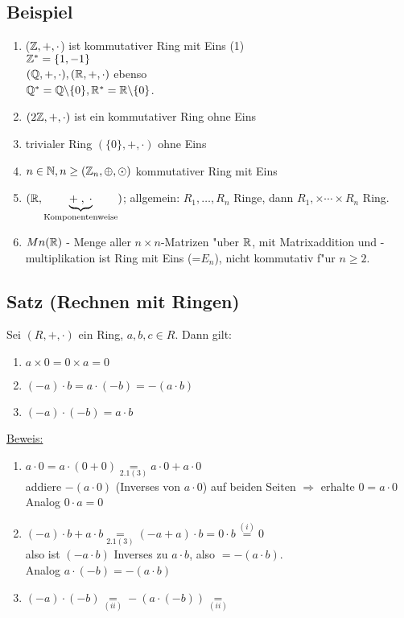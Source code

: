 \subsection{Beispiel}
\begin{enumerate}
	\item
	($\mathbb{Z}, +, \cdot$) ist kommutativer Ring mit Eins (1)\\
	$\mathbb{Z}^* = \{1,-1\}$\\
	$(\mathbb{Q}, +, \cdot), (\mathbb{R}, +, \cdot)$ ebenso\\
	$\mathbb{Q}^*=\mathbb{Q} \backslash \{0\}, \mathbb{R}^* = \mathbb{R} \backslash \{0\}$.
	\item
	$(2\mathbb{Z}, +, \cdot)$ ist ein kommutativer Ring ohne Eins
	\item
	trivialer Ring $(\{0\},+, \cdot)$ ohne Eins
	\item
	$n \in \mathbb{N}, n \geq (\mathbb{Z}_n, \oplus, \odot)$ kommutativer Ring mit Eins
	\item
	$(\mathbb{R}, \underbrace{+\; ,\; \cdot}_{\text{Komponentenweise}})$; allgemein: $R_1, \dots , R_n$ Ringe, dann $R_1, \times \cdots \times R_n$ Ring.
	\item
	$Mn (\mathbb{R})$ - Menge aller $n \times n$-Matrizen  "uber $\mathbb{R}$, mit Matrixaddition und -multiplikation ist Ring mit Eins (=$E_n$), nicht kommutativ f"ur $ n \geq 2$.
\end{enumerate}
\subsection[Satz: Rechnen mit Ringen]{Satz (Rechnen mit Ringen)}
Sei $(R, +, \cdot)$ ein Ring, $a,b,c \in R$. Dann gilt:
\begin{enumerate}
	\item
	$a \times 0 = 0 \times a = 0$
	\item 
	$(-a)\cdot b = a \cdot (-b) = -(a \cdot b)$
	\item
	$(-a) \cdot (-b) = a \cdot b$
\end{enumerate}
\underline{Beweis:}
\begin{enumerate}
	\item
	$a \cdot 0 = a \cdot (0+0) \underset{2.1(3)}{=}a \cdot 0 + a \cdot 0$\\
	addiere $-(a \cdot 0)$ (Inverses von $a \cdot 0$) auf beiden Seiten $\Rightarrow$ erhalte $0=a \cdot 0$\\
	Analog $0 \cdot a = 0$
	\item
	$(-a)\cdot b + a \cdot b \underset{2.1(3)}{=} (-a+a) \cdot b = 0 \cdot b \overset{(i)}{=}0$\\
	also ist $(-a \cdot b)$ Inverses zu $a \cdot b$, also $=-(a \cdot b)$.\\
	Analog $a \cdot (-b) = -(a \cdot b)$
	\item
	$(-a) \cdot (-b) \underset{(ii)}{=} -(a \cdot (-b)) \underset{(ii)}{=}   $
\end{enumerate}
